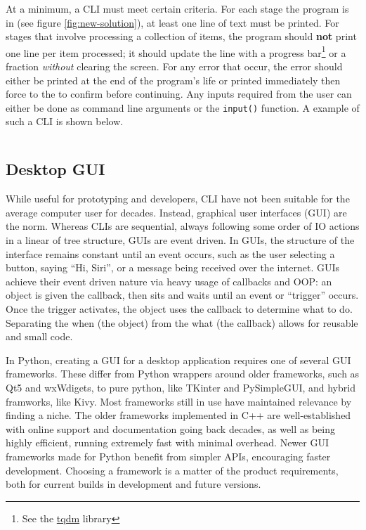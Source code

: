 \documentclass[11pt]{article}
\begin{document}
At a minimum, a CLI must meet certain criteria. For each stage the program is in (see figure \ref{fig:new-solution}), at least one line of text must be printed. For stages that involve processing a collection of items, the program should \textbf{not} print one line per item processed; it should update the line with a progress bar\footnote{See the \href{https://pypi.org/project/tqdm/}{tqdm} library} or a fraction \textit{without} clearing the screen. For any error that occur, the error should either be printed at the end of the program's life or printed immediately then force to the to confirm before continuing. Any inputs required from the user can either be done as command line arguments or the \texttt{input()} function. A example of such a CLI is shown below.

\inputminted[]{shell}{cli_examples/simple_cli.txt}

\subsection{Desktop GUI}

While useful for prototyping and developers, CLI have not been suitable for the average computer user for decades. Instead, graphical user interfaces (GUI) are the norm. Whereas CLIs are sequential, always following some order of IO actions in a linear of tree structure, GUIs are event driven. In GUIs, the structure of the interface remains constant until an event occurs, such as the user selecting a button, saying ``Hi, Siri'', or a message being received over the internet. GUIs achieve their event driven nature via heavy usage of callbacks and OOP: an object is given the callback, then sits and waits until an event or ``trigger'' occurs. Once the trigger activates, the object uses the callback to determine what to do.  Separating the when (the object) from the what (the callback) allows for reusable and small code.

In Python, creating a GUI for a desktop application requires one of several GUI frameworks. These differ from Python wrappers around older frameworks, such as Qt5 and wxWdigets, to pure python, like TKinter and PySimpleGUI, and hybrid framworks, like Kivy. Most frameworks still in use have maintained relevance by finding a niche. The older frameworks implemented in C++ are well-established with online support and documentation going back decades, as well as being highly efficient, running extremely fast with minimal overhead. Newer GUI frameworks made for Python benefit from simpler APIs, encouraging faster development. Choosing a framework is a matter of the product requirements, both for current builds in development and future versions.
\end{document}

